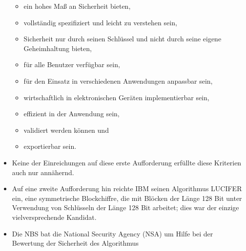 \documentclass[a4paper]{article}
\begin{document}
\begin{multicols}{3}
\begin{itemize}
              \begin{itemize}
                  \item
                        ein hohes Maß an Sicherheit bieten,
                  \item
                        vollständig spezifiziert und leicht zu verstehen sein,
                  \item
                        Sicherheit nur durch seinen Schlüssel und nicht durch seine eigene
                        Geheimhaltung bieten,
                  \item
                        für alle Benutzer verfügbar sein,
                  \item
                        für den Einsatz in verschiedenen Anwendungen anpassbar sein,
                  \item
                        wirtschaftlich in elektronischen Geräten implementierbar sein,
                  \item
                        effizient in der Anwendung sein,
                  \item
                        validiert werden können und
                  \item
                        exportierbar sein.
              \end{itemize}
        \item
              Keine der Einreichungen auf diese erste Aufforderung erfüllte diese
              Kriterien auch nur annähernd.
        \item
              Auf eine zweite Aufforderung hin reichte IBM seinen Algorithmus
              LUCIFER ein, eine symmetrische Blockchiffre, die mit Blöcken der Länge
              128 Bit unter Verwendung von Schlüsseln der Länge 128 Bit arbeitet;
              dies war der einzige vielversprechende Kandidat.
        \item
              Die NBS bat die National Security Agency (NSA) um Hilfe bei der
              Bewertung der Sicherheit des Algorithmus


\end{itemize}
\end{multicols}
\end{document}
